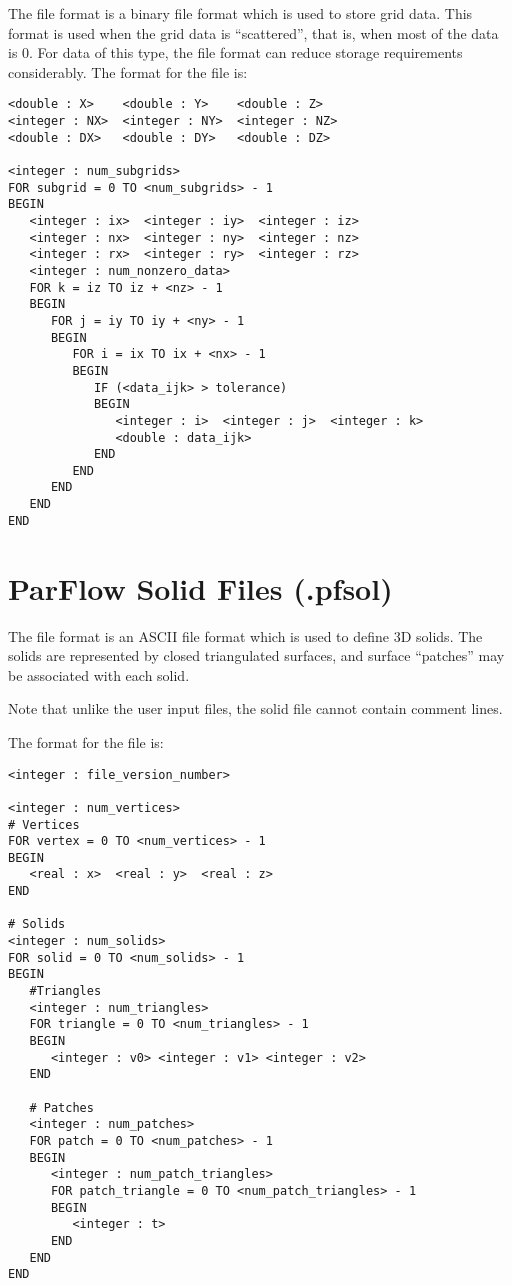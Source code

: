 The  file format is a binary file format which is used
to store \parflow{} grid data.
This format is used when the grid data is ``scattered'', that is,
when most of the data is 0.
For data of this type, the  file format can reduce
storage requirements considerably.
The format for the file is:

\begin{display}\begin{verbatim}
<double : X>    <double : Y>    <double : Z>
<integer : NX>  <integer : NY>  <integer : NZ>
<double : DX>   <double : DY>   <double : DZ>

<integer : num_subgrids>
FOR subgrid = 0 TO <num_subgrids> - 1
BEGIN
   <integer : ix>  <integer : iy>  <integer : iz>
   <integer : nx>  <integer : ny>  <integer : nz>
   <integer : rx>  <integer : ry>  <integer : rz>
   <integer : num_nonzero_data>
   FOR k = iz TO iz + <nz> - 1
   BEGIN
      FOR j = iy TO iy + <ny> - 1
      BEGIN
         FOR i = ix TO ix + <nx> - 1
         BEGIN
            IF (<data_ijk> > tolerance)
            BEGIN
               <integer : i>  <integer : j>  <integer : k>
               <double : data_ijk>
            END
         END
      END
   END
END
\end{verbatim}\end{display}


\section{ParFlow Solid Files (.pfsol)}
\label{ParFlow Solid Files (.pfsol)}

The  file format is an ASCII file format which is
used to define 3D solids.
The solids are represented by closed triangulated surfaces,
and surface ``patches'' may be associated with each solid.

Note that unlike the user input files, the solid file cannot contain comment
lines.

The format for the file is:

\begin{display}\begin{verbatim}
<integer : file_version_number>

<integer : num_vertices>
# Vertices
FOR vertex = 0 TO <num_vertices> - 1
BEGIN
   <real : x>  <real : y>  <real : z>
END

# Solids
<integer : num_solids>
FOR solid = 0 TO <num_solids> - 1
BEGIN
   #Triangles
   <integer : num_triangles>
   FOR triangle = 0 TO <num_triangles> - 1
   BEGIN
      <integer : v0> <integer : v1> <integer : v2>
   END

   # Patches
   <integer : num_patches>
   FOR patch = 0 TO <num_patches> - 1
   BEGIN
      <integer : num_patch_triangles>
      FOR patch_triangle = 0 TO <num_patch_triangles> - 1
      BEGIN
         <integer : t>
      END
   END
END
\end{verbatim}\end{display}

